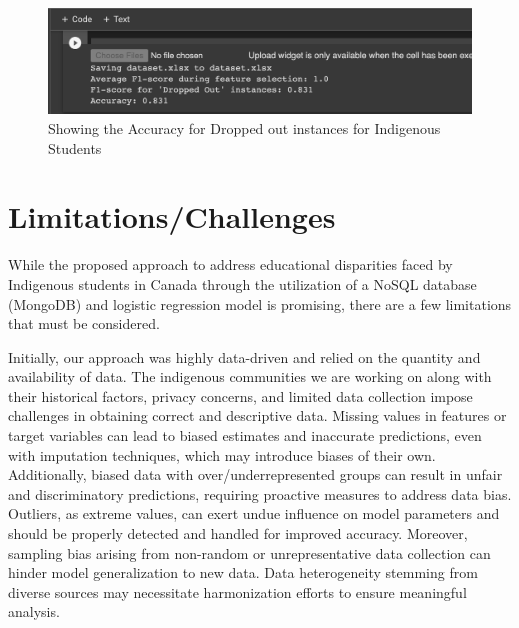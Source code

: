 \documentclass[conference]{IEEEtran}
\begin{document}
\begin{figure}[!htb]
	\centering 
	\includegraphics[width=1.0\linewidth,keepaspectratio]{images/Result.png}	
	\caption{Showing the Accuracy for Dropped out instances for Indigenous Students} 
	\label{fig:result}
\end{figure}

\section{\textbf{Limitations/Challenges}}
While the proposed approach to address educational disparities faced by Indigenous students in Canada through the utilization of a NoSQL database (MongoDB) and logistic regression model is promising, there are a few limitations that must be considered.

Initially, our approach was highly data-driven and relied on the quantity and availability of data. The indigenous communities we are working on along with their historical factors, privacy concerns, and limited data collection impose challenges in obtaining correct and descriptive data. Missing values in features or target variables can lead to biased estimates and inaccurate predictions, even with imputation techniques, which may introduce biases of their own. Additionally, biased data with over/underrepresented groups can result in unfair and discriminatory predictions, requiring proactive measures to address data bias. Outliers, as extreme values, can exert undue influence on model parameters and should be properly detected and handled for improved accuracy. Moreover, sampling bias arising from non-random or unrepresentative data collection can hinder model generalization to new data. Data heterogeneity stemming from diverse sources may necessitate harmonization efforts to ensure meaningful analysis.
\end{document}
